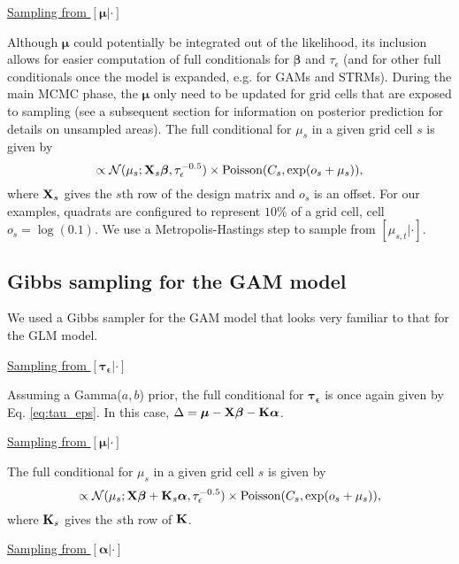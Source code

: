 \documentclass[12pt,fleqn]{article}
\begin{document}
\begin{flushleft}
\underline{Sampling from $[\boldsymbol{\mu}|\cdot]$}

Although $\boldsymbol{\mu}$ could potentially be integrated out of the likelihood, its inclusion allows for easier computation of full conditionals for $\boldsymbol{\beta}$ and $\tau_\epsilon$ (and for other full conditionals once the model is expanded, e.g. for GAMs and STRMs).  During the main MCMC phase, the $\boldsymbol{\mu}$ only need to be updated for grid cells that are exposed to sampling (see a subsequent section for information on posterior prediction for details on unsampled areas).  The full conditional for $\mu_s$ in a given grid cell $s$ is given by
\begin{equation*}
  [\mu_{s,t} | \cdot] \propto \mathcal{N}(\mu_s;{\bf X}_s \boldsymbol{\beta},\tau_\epsilon^{-0.5}) \times \textrm{Poisson}(C_s,\exp(o_s+\mu_s)),
\end{equation*}
where ${\bf X}_s$ gives the $s$th row of the design matrix and $o_s$ is an offset.  For our examples, quadrats are configured to represent $10\%$ of a grid cell, cell $o_s = \log(0.1)$.
We use a Metropolis-Hastings step to sample from $[\mu_{s,t} | \cdot]$.

\subsection{Gibbs sampling for the GAM model}

We used a Gibbs sampler for the GAM model that looks very familiar to that for the GLM model.

\underline{Sampling from $[\boldsymbol{\tau_\epsilon}|\cdot]$}

Assuming a Gamma($a,b$) prior, the full conditional for $\boldsymbol{\tau_\epsilon}$ is once again given by Eq. \ref{eq:tau_eps}.  In this case,
$\Delta = \boldsymbol{\mu}-{\bf X}\boldsymbol{\beta}-{\bf K}\boldsymbol{\alpha}$.

\underline{Sampling from $[\boldsymbol{\mu}|\cdot]$}

The full conditional for $\mu_s$ in a given grid cell $s$ is given by
\begin{equation*}
  [\mu_{s,t} | \cdot] \propto \mathcal{N}(\mu_s;{\bf X}\boldsymbol{\beta}+{\bf K}_s \boldsymbol{\alpha},\tau_\epsilon^{-0.5}) \times \textrm{Poisson}(C_s,\exp(o_s+\mu_s)),
\end{equation*}
where ${\bf K}_s$ gives the $s$th row of ${\bf K}$.

\underline{Sampling from $[\boldsymbol{\alpha}|\cdot]$}


\end{flushleft}
\end{document}
